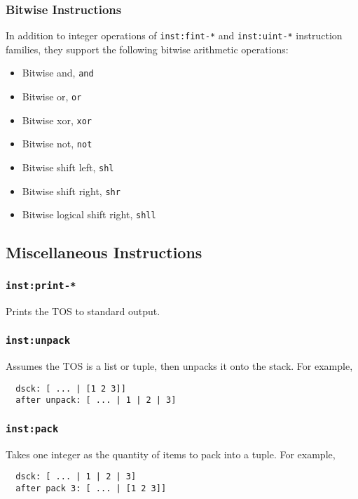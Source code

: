 \documentclass{article}
\newcommand{\inst}[1] {\texttt{inst:#1}}
\begin{document}
\subsubsection{Bitwise Instructions}

In addition to integer operations of \inst{fint-*} and \inst{uint-*} instruction families, they support the following bitwise arithmetic operations:
\begin{itemize}
\item Bitwise and, \texttt{and}
\item Bitwise or, \texttt{or}
\item Bitwise xor, \texttt{xor}
\item Bitwise not, \texttt{not}
\item Bitwise shift left, \texttt{shl}
\item Bitwise shift right, \texttt{shr}
\item Bitwise logical shift right, \texttt{shll}
\end{itemize}

\subsection{Miscellaneous Instructions}

\subsubsection{\inst{print-*}}

Prints the TOS to standard output.

\subsubsection{\inst{unpack}}

Assumes the TOS is a list or tuple, then unpacks it onto the stack. For example,
\begin{verbatim}
  dsck: [ ... | [1 2 3]]
  after unpack: [ ... | 1 | 2 | 3]
\end{verbatim}

\subsubsection{\inst{pack}}

Takes one integer as the quantity of items to pack into a tuple. For example,
\begin{verbatim}
  dsck: [ ... | 1 | 2 | 3]
  after pack 3: [ ... | [1 2 3]]
\end{verbatim}
\end{document}
